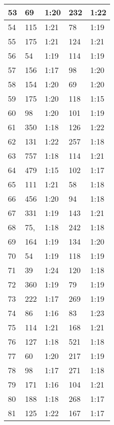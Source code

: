\begin{center}
\begin{longtable}{|p{2cm}|l|l|l|l|}
53      & 69  	  & 1:20	&	232    & 1:22 \\ \hline
54      & 115 	  & 1:21	&	78     & 1:19 \\ \hline
55      & 175 	  & 1:21	&	124    & 1:21 \\ \hline
56      & 54  	  & 1:19	&	114    & 1:19 \\ \hline
57      & 156 	  & 1:17	&	98     & 1:20 \\ \hline
58      & 154 	  & 1:20	&	69     & 1:20 \\ \hline
59      & 175 	  & 1:20	&	118    & 1:15 \\ \hline
60      & 98  	  & 1:20	&	101    & 1:19 \\ \hline
61      & 350 	  & 1:18	&	126    & 1:22 \\ \hline
62      & 131 	  & 1:22	&	257    & 1:18 \\ \hline
63      & 757 	  & 1:18	&	114    & 1:21 \\ \hline
64      & 479 	  & 1:15	&	102    & 1:17 \\ \hline
65      & 111 	  & 1:21	&	58     & 1:18 \\ \hline
66      & 456 	  & 1:20	&	94     & 1:18 \\ \hline
67      & 331 	  & 1:19	&	143    & 1:21 \\ \hline
68      & 75, 	  & 1:18	&	242    & 1:18 \\ \hline
69      & 164 	  & 1:19	&	134    & 1:20 \\ \hline
70      & 54  	  & 1:19	&	118    & 1:19 \\ \hline
71      & 39        & 1:24	&	120    & 1:18 \\ \hline
72      & 360 	  & 1:19	&	79     & 1:19 \\ \hline
73      & 222 	  & 1:17	&	269    & 1:19 \\ \hline
74      & 86  	  & 1:16	&	83     & 1:23 \\ \hline
75      & 114 	  & 1:21	&	168    & 1:21 \\ \hline
76      & 127 	  & 1:18	&	521    & 1:18 \\ \hline
77      & 60  	  & 1:20	&	217    & 1:19 \\ \hline
78      & 98  	  & 1:17	&	271    & 1:18 \\ \hline
79      & 171 	  & 1:16	&	104    & 1:21 \\ \hline
80      & 188 	  & 1:18	&	268    & 1:17 \\ \hline
81      & 125 	  & 1:22	&	167    & 1:17 \\ \hline

\end{longtable}
\end{center}
